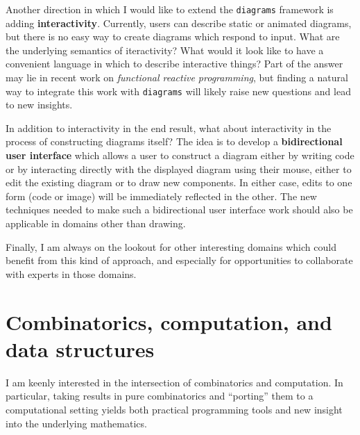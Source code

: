 \documentclass[12pt]{article}
\begin{document}
Another direction in which I would like to extend the
\texttt{diagrams} framework is adding \textbf{interactivity}.
Currently, users can describe static or animated diagrams, but there
is no easy way to create diagrams which respond to input.  What are
the underlying semantics of iteractivity?  What would it look like to
have a convenient language in which to describe interactive things?
Part of the answer may lie in recent work on \emph{functional reactive
  programming}, but finding a natural way to integrate this work with
\texttt{diagrams} will likely raise new questions and lead to new
insights.

In addition to interactivity in the end result, what about
interactivity in the process of constructing diagrams itself?  The
idea is to develop a \textbf{bidirectional user interface} which
allows a user to construct a diagram either by writing code or by
interacting directly with the displayed diagram using their mouse,
either to edit the existing diagram or to draw new components.  In
either case, edits to one form (code or image) will be immediately
reflected in the other.  The new techniques needed to make such a
bidirectional user interface work should also be applicable in domains
other than drawing.

Finally, I am always on the lookout for other interesting domains
which could benefit from this kind of approach, and especially for
opportunities to collaborate with experts in those domains.

\section*{Combinatorics, computation, and data structures}
\label{sec:combinatorics}

I am keenly interested in the intersection of combinatorics and
computation.  In particular, taking results in pure combinatorics and
``porting'' them to a computational setting yields both practical
programming tools and new insight into the underlying mathematics.
\end{document}
